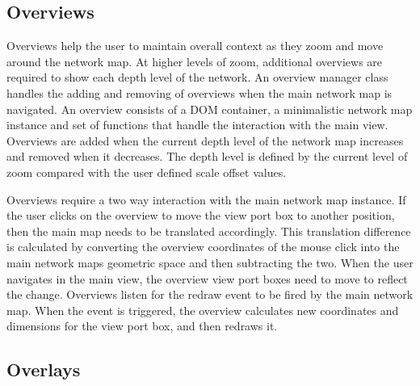 \documentclass[11pt, a4paper]{article}
\begin{document}
\subsection{Overviews}
\label{sec:overviews.impl}

Overviews help the user to maintain overall context as they zoom and move around
the network map. At higher levels of zoom, additional overviews are required to
show each depth level of the network. An overview manager class handles the
adding and removing of overviews when the main network map is navigated. An
overview consists of a DOM container, a minimalistic network map instance and set
of functions that handle the interaction with the main view. Overviews are added
when the current depth level of the network map increases and removed when it
decreases. The depth level is defined by the current level of zoom compared with
the user defined scale offset values.

Overviews require a two way interaction with the main network map instance. If
the user clicks on the overview to move the view port box to another position,
then the main map needs to be translated accordingly. This translation
difference is calculated by converting the overview coordinates of the mouse
click into the main network maps geometric space and then subtracting the two.
When the user navigates in the main view, the overview view port boxes need to
move to reflect the change. Overviews listen for the redraw event to be fired by
the main network map. When the event is triggered, the overview calculates new
coordinates and dimensions for the view port box, and then redraws it.


\subsection{Overlays}
\label{sec:overlays.impl}
\end{document}

